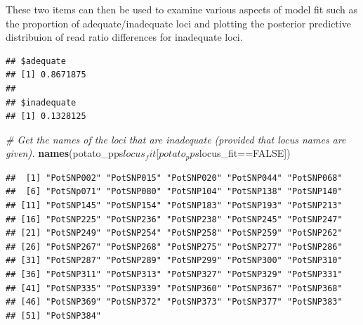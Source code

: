 \documentclass[]{article}
\newenvironment{Shaded}{\begin{snugshade}}{\end{snugshade}}
\newcommand{\KeywordTok}[1]{\textcolor[rgb]{0.13,0.29,0.53}{\textbf{{#1}}}}
\newcommand{\DataTypeTok}[1]{\textcolor[rgb]{0.13,0.29,0.53}{{#1}}}
\newcommand{\DecValTok}[1]{\textcolor[rgb]{0.00,0.00,0.81}{{#1}}}
\newcommand{\StringTok}[1]{\textcolor[rgb]{0.31,0.60,0.02}{{#1}}}
\newcommand{\CommentTok}[1]{\textcolor[rgb]{0.56,0.35,0.01}{\textit{{#1}}}}
\newcommand{\OtherTok}[1]{\textcolor[rgb]{0.56,0.35,0.01}{{#1}}}
\newcommand{\NormalTok}[1]{{#1}}
\begin{document}
These two items can then be used to examine various aspects of model fit
such as the proportion of adequate/inadequate loci and plotting the
posterior predictive distribuion of read ratio differences for
inadequate loci.

\begin{Shaded}
\end{Shaded}

\begin{verbatim}
## $adequate
## [1] 0.8671875
## 
## $inadequate
## [1] 0.1328125
\end{verbatim}

\begin{Shaded}
\begin{Highlighting}[]
\CommentTok{# Get the names of the loci that are inadequate (provided that locus names are given).}
\KeywordTok{names}\NormalTok{(potato_pps$locus_fit[potato_pps$locus_fit==}\OtherTok{FALSE}\NormalTok{])}
\end{Highlighting}
\end{Shaded}

\begin{verbatim}
##  [1] "PotSNP002" "PotSNP015" "PotSNP020" "PotSNP044" "PotSNP068"
##  [6] "PotSNp071" "PotSNP080" "PotSNP104" "PotSNP138" "PotSNP140"
## [11] "PotSNP145" "PotSNP154" "PotSNP183" "PotSNP193" "PotSNP213"
## [16] "PotSNP225" "PotSNP236" "PotSNP238" "PotSNP245" "PotSNP247"
## [21] "PotSNP249" "PotSNP254" "PotSNP258" "PotSNP259" "PotSNP262"
## [26] "PotSNP267" "PotSNP268" "PotSNP275" "PotSNP277" "PotSNP286"
## [31] "PotSNP287" "PotSNP289" "PotSNP299" "PotSNP300" "PotSNP310"
## [36] "PotSNP311" "PotSNP313" "PotSNP327" "PotSNP329" "PotSNP331"
## [41] "PotSNP335" "PotSNP339" "PotSNP360" "PotSNP367" "PotSNP368"
## [46] "PotSNP369" "PotSNP372" "PotSNP373" "PotSNP377" "PotSNP383"
## [51] "PotSNP384"
\end{verbatim}

\begin{Shaded}
\end{Shaded}
\end{document}
